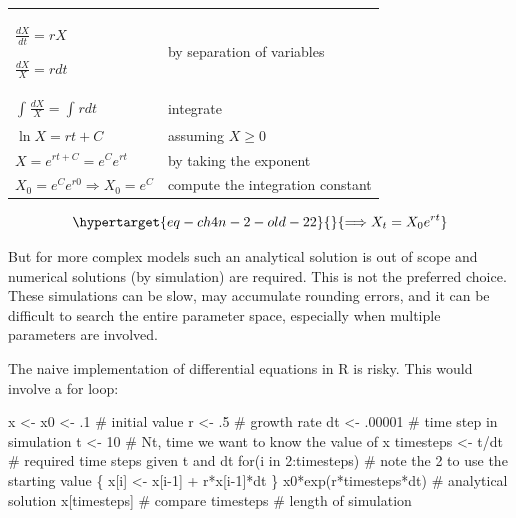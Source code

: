 \documentclass[
  a4paper,
  DIV=11,
  numbers=noendperiod,
  oneside]{scrreprt}
\newenvironment{Shaded}{\begin{snugshade}}{\end{snugshade}}
\newcommand{\CommentTok}[1]{\textcolor[rgb]{0.37,0.37,0.37}{#1}}
\newcommand{\ControlFlowTok}[1]{\textcolor[rgb]{0.00,0.23,0.31}{#1}}
\newcommand{\DecValTok}[1]{\textcolor[rgb]{0.68,0.00,0.00}{#1}}
\newcommand{\FunctionTok}[1]{\textcolor[rgb]{0.28,0.35,0.67}{#1}}
\newcommand{\NormalTok}[1]{\textcolor[rgb]{0.00,0.23,0.31}{#1}}
\newcommand{\OtherTok}[1]{\textcolor[rgb]{0.00,0.23,0.31}{#1}}
\newcommand{\SpecialCharTok}[1]{\textcolor[rgb]{0.37,0.37,0.37}{#1}}
\begin{document}
\begin{longtable}[]{@{}
  >{\raggedright\arraybackslash}p{}
  >{\raggedright\arraybackslash}p{}@{}}
\toprule\noalign{}
\endhead
\bottomrule\noalign{}
\endlastfoot
\(\frac{dX}{dt} = rX\)

\(\frac{dX}{X} = rdt\) & by separation of variables \\
\(\int_{}^{}\frac{dX}{X} = \int_{}^{}{rdt}\) & integrate \\
\(\ln X = rt + C\) & assuming \(X \geq 0\) \\
\(X = e^{rt + C} = e^{C}e^{rt}\) & by taking the exponent \\
\(X_{0} = e^{C}e^{r0} \Longrightarrow X_{0} = e^{C}\) & compute the
integration constant \\
\end{longtable}

\begin{equation}\protect\hypertarget{eq-ch4n-2-old-22}{}{
\Longrightarrow X_{t} = {X_{0}e}^{rt}
}\label{eq-ch4n-2-old-22}\end{equation}

But for more complex models such an analytical solution is out of scope
and numerical solutions (by simulation) are required. This is not the
preferred choice. These simulations can be slow, may accumulate rounding
errors, and it can be difficult to search the entire parameter space,
especially when multiple parameters are involved.

The naive implementation of differential equations in R is risky. This
would involve a for loop:

\begin{Shaded}
\begin{Highlighting}[]
\NormalTok{x }\OtherTok{\textless{}{-}}\NormalTok{ x0 }\OtherTok{\textless{}{-}}\NormalTok{ .}\DecValTok{1}  \CommentTok{\# initial value}
\NormalTok{r }\OtherTok{\textless{}{-}}\NormalTok{ .}\DecValTok{5} \CommentTok{\# growth rate}
\NormalTok{dt }\OtherTok{\textless{}{-}}\NormalTok{ .}\DecValTok{00001} \CommentTok{\# time step in simulation}
\NormalTok{t }\OtherTok{\textless{}{-}} \DecValTok{10}  \CommentTok{\# Nt, time we want to know the value of x}
\NormalTok{timesteps }\OtherTok{\textless{}{-}}\NormalTok{ t}\SpecialCharTok{/}\NormalTok{dt }\CommentTok{\# required time steps given t and dt}
\ControlFlowTok{for}\NormalTok{(i }\ControlFlowTok{in} \DecValTok{2}\SpecialCharTok{:}\NormalTok{timesteps) }\CommentTok{\# note the 2 to use the starting value}
\NormalTok{\{}
\NormalTok{  x[i] }\OtherTok{\textless{}{-}}\NormalTok{ x[i}\DecValTok{{-}1}\NormalTok{] }\SpecialCharTok{+}\NormalTok{ r}\SpecialCharTok{*}\NormalTok{x[i}\DecValTok{{-}1}\NormalTok{]}\SpecialCharTok{*}\NormalTok{dt}
\NormalTok{\}}
\NormalTok{x0}\SpecialCharTok{*}\FunctionTok{exp}\NormalTok{(r}\SpecialCharTok{*}\NormalTok{timesteps}\SpecialCharTok{*}\NormalTok{dt) }\CommentTok{\# analytical solution}
\NormalTok{x[timesteps] }\CommentTok{\# compare}
\NormalTok{timesteps }\CommentTok{\# length of simulation}
\end{Highlighting}
\end{Shaded}
\end{document}

